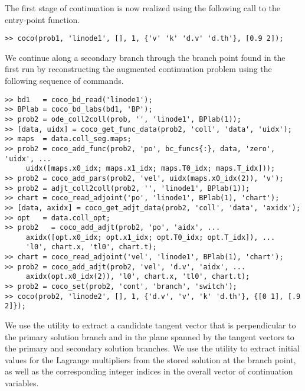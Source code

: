 The first stage of continuation is now realized using the following call to the  entry-point function.
\begin{lstlisting}[language=coco-highlight]
>> coco(prob1, 'linode1', [], 1, {'v' 'k' 'd.v' 'd.th'}, [0.9 2]);
\end{lstlisting}
We continue along a secondary branch through the branch point found in the first run by reconstructing the augmented continuation problem using the following sequence of commands.
\begin{lstlisting}[language=coco-highlight]
>> bd1   = coco_bd_read('linode1');
>> BPlab = coco_bd_labs(bd1, 'BP');
>> prob2 = ode_coll2coll(prob, '', 'linode1', BPlab(1));
>> [data, uidx] = coco_get_func_data(prob2, 'coll', 'data', 'uidx');
>> maps  = data.coll_seg.maps;
>> prob2 = coco_add_func(prob2, 'po', bc_funcs{:}, data, 'zero', 'uidx', ...
     uidx([maps.x0_idx; maps.x1_idx; maps.T0_idx; maps.T_idx]));
>> prob2 = coco_add_pars(prob2, 'vel', uidx(maps.x0_idx(2)), 'v');
>> prob2 = adjt_coll2coll(prob2, '', 'linode1', BPlab(1));
>> chart = coco_read_adjoint('po', 'linode1', BPlab(1), 'chart');
>> [data, axidx] = coco_get_adjt_data(prob2, 'coll', 'data', 'axidx');
>> opt   = data.coll_opt;
>> prob2   = coco_add_adjt(prob2, 'po', 'aidx', ...
     axidx([opt.x0_idx; opt.x1_idx; opt.T0_idx; opt.T_idx]), ...
     'l0', chart.x, 'tl0', chart.t);
>> chart = coco_read_adjoint('vel', 'linode1', BPlab(1), 'chart');
>> prob2 = coco_add_adjt(prob2, 'vel', 'd.v', 'aidx', ...
     axidx(opt.x0_idx(2)), 'l0', chart.x, 'tl0', chart.t);
>> prob2 = coco_set(prob2, 'cont', 'branch', 'switch');
>> coco(prob2, 'linode2', [], 1, {'d.v', 'v', 'k' 'd.th'}, {[0 1], [.9 2]});
\end{lstlisting}
We use the  utility to extract a candidate tangent vector that is perpendicular to the primary solution branch and in the plane spanned by the tangent vectors to the primary and secondary solution branches. We use the  utility to extract initial values for the Lagrange multipliers from the stored solution at the branch point, as well as the corresponding integer indices in the overall vector of continuation variables.

